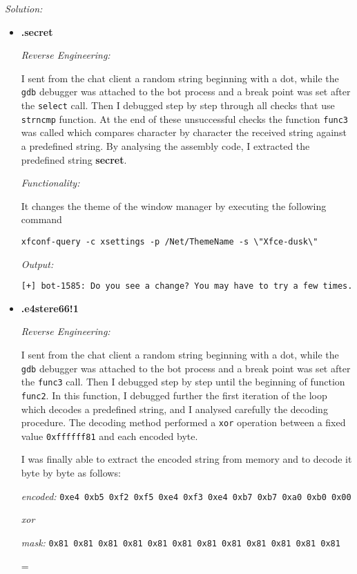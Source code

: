 \documentclass[a4paper,11pt]{article}
\newenvironment{solution}%
{\par{\noindent\small\textit{Solution:}}\vspace{-12pt}\begin{framed}}%
{\end{framed}\par}
\begin{document}
\ifsolution
\begin{solution}
\begin{itemize}
\item \textbf{.secret}

\emph{Reverse Engineering:}

I sent from the chat client a random string beginning with a dot, while the \texttt{gdb} debugger was attached to the bot process and a break point was set after the \texttt{select} call. Then I debugged step by step through all checks that use \texttt{strncmp} function. At the end of these unsuccessful checks the function \texttt{func3} was called which compares character by character the received string against a predefined string. By analysing the assembly code, I extracted the predefined string \textbf{secret}.   

\emph{Functionality:}

It changes the theme of the window manager by executing the following command

 \verb|xfconf-query -c xsettings -p /Net/ThemeName -s \"Xfce-dusk\"|

\emph{Output:}

\verb|[+] bot-1585: Do you see a change? You may have to try a few times.|

\newpage
\item \textbf{.e4stere66!1}

\emph{Reverse Engineering:}

I sent from the chat client a random string beginning with a dot, while the \texttt{gdb} debugger was attached to the bot process and a break point was set after the \texttt{func3} call. Then I debugged step by step until the beginning of function \texttt{func2}. In this function, I debugged further the first iteration of the loop which decodes a predefined string, and I analysed carefully the decoding procedure. The decoding method performed a \texttt{xor} operation between a fixed value \texttt{0xffffff81} and each encoded byte.  

I was finally able to extract the encoded string from memory and to decode it byte by byte as follows:

  \emph{encoded:} \texttt{0xe4  0xb5  0xf2  0xf5  0xe4  0xf3  0xe4  0xb7  0xb7  0xa0  0xb0  0x00}

   \centerline{\emph{xor}}  

   \emph{mask:} \texttt{0x81  0x81  0x81  0x81  0x81  0x81  0x81  0x81  0x81  0x81  0x81  0x81}

    \centerline{=}     
   

\end{itemize}
\end{solution}
\end{document}
